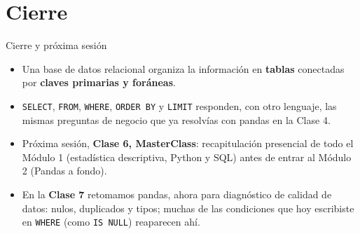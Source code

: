 \documentclass[aspectratio=169,11pt]{beamer}
\begin{document}
\section{Cierre}
\begin{frame}{Cierre y próxima sesión}
  \begin{itemize}
    \item Una base de datos relacional organiza la información en
      \textbf{tablas} conectadas por \textbf{claves primarias y foráneas}.
    \item \texttt{SELECT}, \texttt{FROM}, \texttt{WHERE}, \texttt{ORDER
      BY} y \texttt{LIMIT} responden, con otro lenguaje, las mismas
      preguntas de negocio que ya resolvías con pandas en la Clase 4.
    \item Próxima sesión, \textbf{Clase 6, MasterClass}: recapitulación
      presencial de todo el Módulo 1 (estadística descriptiva, Python y
      SQL) antes de entrar al Módulo 2 (Pandas a fondo).
    \item En la \textbf{Clase 7} retomamos pandas, ahora para diagnóstico
      de calidad de datos: nulos, duplicados y tipos; muchas de las
      condiciones que hoy escribiste en \texttt{WHERE} (como \texttt{IS
      NULL}) reaparecen ahí.
  \end{itemize}
\end{frame}

{
\begin{frame}[plain]
\end{frame}
}
\end{document}
